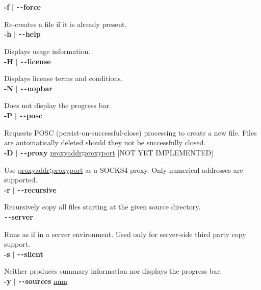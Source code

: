 \documentclass{article}
\begin{document}
		\noindent \textbf{-f} $\vert$ \textbf{\texttt{-{}-}force}

		\noindent Re-creates a file if it is already present. \\
		
		\noindent \textbf{-h} $\vert$ \textbf{\texttt{-{}-}help}

		\noindent Displays usage information. \\
		
		\noindent \textbf{-H} $\vert$ \textbf{\texttt{-{}-}license}

		\noindent Displays license terms and conditions. \\
		
		\noindent \textbf{-N} $\vert$ \textbf{\texttt{-{}-}nopbar}

		\noindent Does not display the progress bar. \\
		
		\noindent \textbf{-P} $\vert$ \textbf{\texttt{-{}-}posc}

		\noindent Requests POSC (persist-on-successful-close) processing
		to create a new file. Files are automatically deleted should they not be
		successfully closed. \\
		
		\noindent \textbf{-D} $\vert$ \textbf{\texttt{-{}-}proxy} \underline{proxyaddr}\textbf{:}\underline{proxyport} [NOT YET IMPLEMENTED]
		
		\noindent Use \underline{proxyaddr}\textbf{:}\underline{proxyport} as a SOCKS4 proxy. Only numerical addresses are supported. \\

		\noindent \textbf{-r} $\vert$ \textbf{\texttt{-{}-}recursive}

		\noindent Recursively copy all files starting at the given source directory. \\
		
		\noindent \textbf{\texttt{-{}-}server}

		\noindent Runs as if in a server environment. Used only for server-side
		third party copy support. \\
		
		\noindent\textbf{-s} $\vert$ \textbf{\texttt{-{}-}silent}

		\noindent Neither produces summary information nor displays the progress bar. \\
		
		\noindent \textbf{-y} $\vert$ \textbf{\texttt{-{}-}sources} \underline{num}
\end{document}
